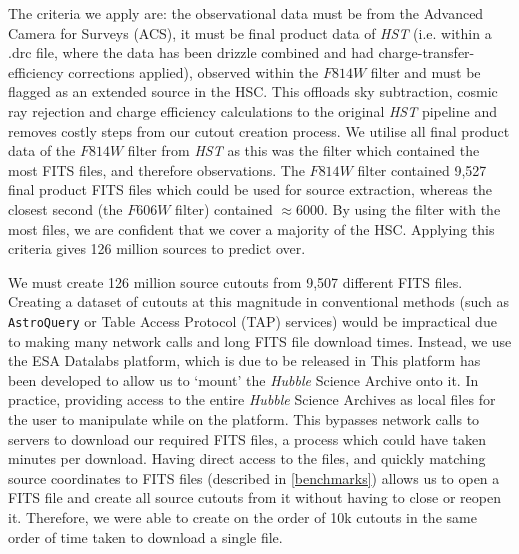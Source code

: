 The criteria we apply are: the observational data must be from the Advanced Camera for Surveys (ACS), it must be final product data of \emph{HST} (i.e. within a .drc file, where the data has been drizzle \citep{2015ASPC..495..281A} combined and had charge-transfer-efficiency corrections applied), observed within the $F814W$ filter and must be flagged as an extended source in the HSC. This offloads sky subtraction, cosmic ray rejection and charge efficiency calculations to the original \emph{HST} pipeline and removes costly steps from our cutout creation process. We utilise all final product data of the $F814W$ filter from \emph{HST} as this was the filter which contained the most FITS files, and therefore observations. The $F814W$ filter contained 9,527 final product FITS files which could be used for source extraction, whereas the closest second (the $F606W$ filter) contained $\approx$6000. By using the filter with the most files, we are confident that we cover a majority of the HSC. Applying this criteria gives 126 million sources to predict over.

We must create 126 million source cutouts from 9,507 different FITS files. Creating a dataset of cutouts at this magnitude in conventional methods (such as \texttt{AstroQuery} or Table Access Protocol (TAP) services) would be impractical due to making many network calls and long FITS file download times. Instead, we use the ESA Datalabs platform, which is due to be released in \DIFdelbegin {}\DIFdelend \DIFaddbegin {}\DIFaddend This platform has been developed to allow us to `mount' the \emph{Hubble} Science Archive onto it. In practice, providing access to the entire \emph{Hubble} Science Archives as local files for the user to manipulate while on the platform. This bypasses network calls to servers to download our required FITS files, a process which could have taken minutes per download. Having direct access to the files, and quickly matching source coordinates to FITS files (described in \DIFdelbegin {}\DIFdelend \DIFaddbegin {}\DIFaddend \ref{benchmarks}) allows us to open a FITS file and create all source cutouts from it without having to close or reopen it. Therefore, we were able to create on the order of 10k cutouts in the same order of time taken to download a single file.

